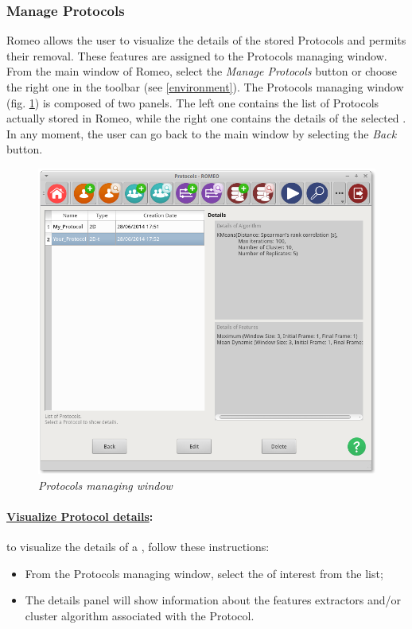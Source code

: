 \subsubsection{Manage Protocols}
\label{manageprotocol}
Romeo allows the user to visualize the details of the stored Protocols\g{} and permits their removal. These features are assigned to the Protocols\g{} managing window.\\
From the main window of Romeo, select the \textit{Manage Protocols} button or choose the right one in the toolbar (see \ref{environment}). The Protocols\g{} managing window (fig. \ref{manageprotocolimg}) is composed of two panels. The left one contains the list of Protocols\g{} actually stored in Romeo, while the right one contains the details of the selected \protocol{}. In any moment, the user can go back to the main window by selecting the \textit{Back} button.
\begin{figure}[!h]
\begin{center}
\includegraphics[scale=0.4]{./Images/ViewProtocols}
\caption{\textit{Protocols managing window}}
\label{manageprotocolimg}
\end{center}
\end{figure}

\paragraph{\underline{Visualize Protocol details}:} to visualize the details of a \protocol{}, follow these instructions:
\begin{itemize}
\item From the Protocols\g{} managing window, select the \protocol{} of interest from the list;
\item The details panel will show information about the features extractors\g{} and/or cluster algorithm\g{} associated with the Protocol\g{}.
\end{itemize}

